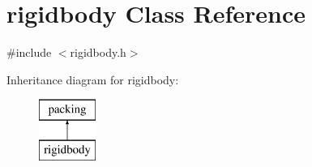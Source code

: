 \hypertarget{classrigidbody}{}\section{rigidbody Class Reference}
\label{classrigidbody}


{\ttfamily \#include $<$rigidbody.\+h$>$}

Inheritance diagram for rigidbody\+:\begin{figure}[H]
\begin{center}
\leavevmode
\includegraphics[height=2.000000cm]{classrigidbody}
\end{center}
\end{figure}
